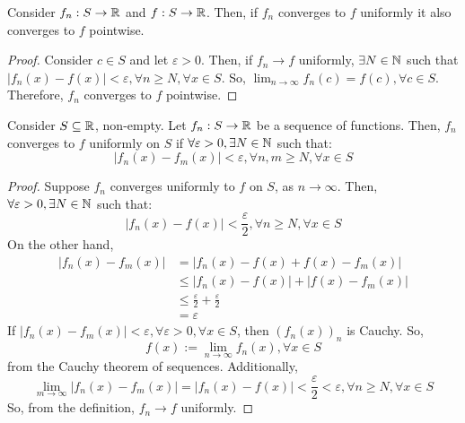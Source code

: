 \begin{theorem}
    Consider $f_n: S \to \mathbb{R}$ and $f: S \to \mathbb{R}$. Then, if $f_n$ converges to $f$ uniformly it also converges to $f$ pointwise.
\end{theorem}

\begin{proof}
    Consider $c \in S$ and let $\varepsilon > 0$. Then, if $f_n \to f$ uniformly, $\exists N \in \mathbb{N}$ such that $|f_n(x) - f(x)| < \varepsilon, \forall n \geq N, \forall x \in S$. So, $\lim_{n \to \infty} f_n(c) = f(c), \forall c \in S$. Therefore, $f_n$ converges to $f$ pointwise.
\end{proof}

\begin{theorem}
    Consider $S \subseteq \mathbb{R}$, non-empty. Let $f_n: S \to \mathbb{R}$ be a sequence of functions. Then, $f_n$ converges to $f$ uniformly on $S$ if $\forall \varepsilon > 0, \exists N \in \mathbb{N}$ such that:
    \begin{equation*}
        |f_n(x) - f_m(x)| < \varepsilon, \forall n, m \geq N, \forall x \in S
    \end{equation*}
\end{theorem}

\begin{proof}
    Suppose $f_n$ converges uniformly to $f$ on $S$, as $n \to \infty$. Then, $\forall \varepsilon > 0, \exists N \in \mathbb{N}$ such that:
    \begin{equation*}
        |f_n(x) - f(x)| < \frac{\varepsilon}{2}, \forall n \geq N, \forall x \in S
    \end{equation*}
    On the other hand,
    \begin{align*}
        |f_n(x) - f_m(x)| &= |f_n(x) - f(x) + f(x) - f_m(x)| \\
        &\leq |f_n(x) - f(x)| + |f(x) - f_m(x)| \\
        &\leq \frac{\varepsilon}{2} + \frac{\varepsilon}{2} \\
        &= \varepsilon
    \end{align*}
    If $|f_n(x) - f_m(x)| < \varepsilon, \forall \varepsilon > 0, \forall x \in S$, then $(f_n(x))_n$ is Cauchy. So,
    \begin{equation*}
        f(x) := \lim \limits_{n \to \infty} f_n(x), \forall x \in S
    \end{equation*}
    from the Cauchy theorem of sequences. Additionally,
    \begin{equation*}
        \lim \limits_{m \to \infty} |f_n(x) - f_m(x)| = |f_n(x) - f(x)| < \frac{\varepsilon}{2} < \varepsilon, \forall n \geq N, \forall x \in S
    \end{equation*}
    So, from the definition, $f_n \to f$ uniformly.
\end{proof}

